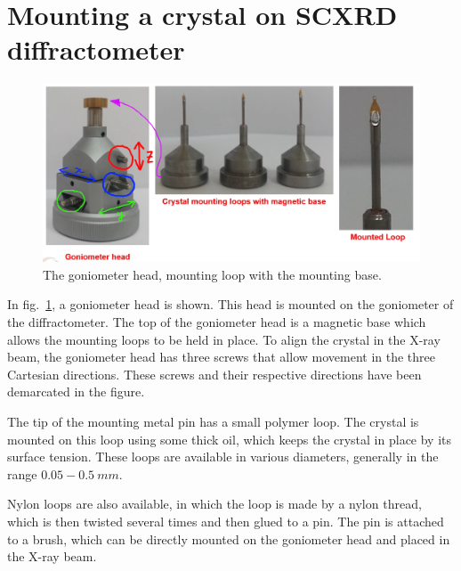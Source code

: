 \section{Mounting a crystal on SCXRD diffractometer}

	\begin{figure}[t]
		\includegraphics[scale=0.5]{goniometer_mod.png}
		\caption{\label{fig:goniometer}The goniometer head, mounting loop with the mounting base.}
	\end{figure}

	In fig.~\ref{fig:goniometer}, a goniometer head is shown. This head is mounted on the goniometer of the diffractometer. The top of the goniometer head is a magnetic base which allows the mounting loops to be held in place. To align the crystal in the X-ray beam, the goniometer head has three screws that allow movement in the three Cartesian directions. These screws and their respective directions have been demarcated in the figure.

		The tip of the mounting metal pin has a small polymer loop. The crystal is mounted on this loop using some thick oil, which keeps the crystal in place by its surface tension. These loops are available in various diameters, generally in the range $0.05-0.5~\si{mm}.$

		Nylon loops are also available, in which the loop is made by a nylon thread, which is then twisted several times and then glued to a pin. The pin is attached to a brush, which can be directly mounted on the goniometer head and placed in the X-ray beam.